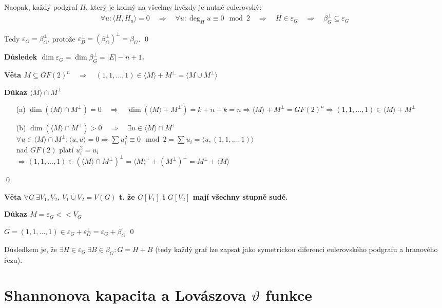 \documentclass[a4paper,12pt,titlepage]{article}
\newcommand{\dk}{\smallskip\noindent\bf Důkaz\rm{} }
\newcommand{\vt}{\smallskip\noindent\bf Věta\rm{} }
\newcommand{\dsl}{\smallskip\noindent\bf Důsledek\rm{} }
\newcommand{\sk}[1]{{\langle #1\rangle}}
\begin{document}
Naopak, každý podgraf $H$, který je kolmý na všechny hvězdy je nutně eulerovský:
\begin{align*}
\forall u: \sk{H,H_u} = 0 \quad\Rightarrow\quad \forall u: \deg_H u \equiv 0 \mod 2 \quad\Rightarrow\quad H \in \varepsilon_G \quad\Rightarrow\quad \beta_G^\bot \subseteq \varepsilon_G
\end{align*}

Tedy $\varepsilon_G = \beta_G^\bot$, protože $\varepsilon_B^\bot = {\left(\beta_G^\bot\right)}^\bot = \beta_G$.
\qed

\dsl $\dim \varepsilon_G = \dim \beta_G^\bot = |E| - n + 1$.


\vt $M \subseteq GF(2)^n \quad\Rightarrow\quad (1,1,\dots,1) \in \sk M + M^\bot = \sk{M\cup M^\bot}$

\dk $\sk M \cap M^\bot$
\begin{enumerate}
\item[(a)] $\dim(\sk M \cap M^\bot) = 0 \quad\Rightarrow\quad \dim(\sk M + M^\bot) = k+n-k = n \Rightarrow \sk M + M^\bot = GF(2)^n \Rightarrow (1,1,\dots,1)\in \sk M + M^\bot$
\item[(b)] $\dim(\sk M \cap M^\bot) > 0 \quad\Rightarrow\quad \exists u\in \sk M \cap M^\bot$ \\ 
$\forall u\in \sk M \cap M^\bot: \sk{u,u} = 0 \Rightarrow \sum u_i^2 \equiv 0 \mod 2 = \sum u_i = \sk{u, (1,1,\dots,1)}$ \\
nad $GF(2)$ platí $u_i^2 = u_i$ \\
$\Rightarrow (1,1,\dots,1) \in {(\sk M \cap M^\bot)}^\bot = {\sk M}^\bot + {(M^\bot)}^\bot = M^\bot + \sk M$
\end{enumerate}
\qed


\vt $\forall G \ \exists V_1,V_2,\ V_1\overset{.}{\cup} V_2 = V(G)$ t. že $G[V_1]$ i $G[V_2]$ mají všechny stupně sudé.

\dk $M = \varepsilon_G << V_G$

$G = (1,1,\dots,1) \in \varepsilon_G + \varepsilon_G^\bot = \varepsilon_G + \beta_G$
\qed

Důsledkem je, že $\exists H \in \varepsilon_G\ \exists B\in \beta_G: G = H + B$ (tedy každý graf lze zapsat jako symetrickou diferenci eulerovského podgrafu a hranového řezu).



\section{Shannonova kapacita a Lovászova $\vartheta$ funkce}
\end{document}
